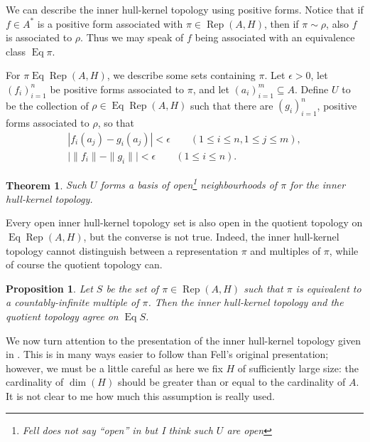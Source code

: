 \documentclass[a4paper,11pt]{article}
\newcommand{\Rep}{\operatorname{Rep}}
\newcommand{\Eq}{\operatorname{Eq}}
\newtheorem{proposition}[lemma]{Proposition}
\newtheorem{theorem}[lemma]{Theorem}
\begin{document}
We can describe the inner hull-kernel topology using positive forms.
Notice that if $f\in A^*$ is a positive form associated with $\pi\in\Rep(A,H)$,
then if $\pi\sim\rho$, also $f$ is associated to $\rho$.  Thus we may speak of
$f$ being associated with an equivalence class $\Eq\pi$.

For $\pi\Eq\Rep(A,H)$, we describe some sets containing $\pi$.  Let $\epsilon>0$,
let $(f_i)_{i=1}^n$ be positive forms associated to $\pi$, and let $(a_i)_{i=1}^m
\subseteq A$.  Define $U$ to be the collection of $\rho\in\Eq\Rep(A,H)$ such that
there are $(g_i)_{i=1}^n$, positive forms associated to $\rho$, so that
\begin{align*}
    | f_i(a_j) - g_i(a_j) | <\epsilon \qquad (1\leq i\leq n, 1\leq j\leq m), \\
    \big| \|f_i\| - \|g_i\| \big| < \epsilon \qquad (1\leq i\leq n).
\end{align*}

\begin{theorem}
Such $U$ forms a basis of open\footnote{Fell does not say ``open'' in \cite{fell2}
but I think such $U$ are open} neighbourhoods of $\pi$ for the inner hull-kernel
topology.
\end{theorem}

Every open inner hull-kernel topology set is also open in the quotient topology
on $\Eq\Rep(A,H)$, but the converse is not true.  Indeed, the inner hull-kernel
topology cannot distinguish between a representation $\pi$ and multiples of
$\pi$, while of course the quotient topology can.

\begin{proposition}
Let $S$ be the set of $\pi\in\Rep(A,H)$ such that $\pi$ is equivalent to a
countably-infinite multiple of $\pi$.  Then the inner hull-kernel topology
and the quotient topology agree on $\Eq S$.
\end{proposition}

We now turn attention to the presentation of the inner hull-kernel topology
given in \cite[Chapter~5]{kan}.  This is in many ways easier to follow
than Fell's original presentation; however, we must be a little careful as
here we fix $H$ of sufficiently large size: the cardinality of $\dim(H)$ should
be greater than or equal to the cardinality of $A$.  It is not clear to me
how much this assumption is really used.
\end{document}
